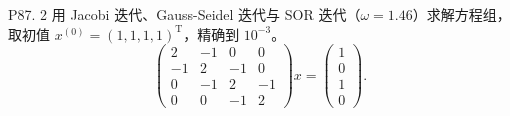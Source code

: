 \documentclass[11pt, a4paper]{ctexart}
\begin{document}
\begin{problem}{P87. 2 用 Jacobi 迭代、Gauss-Seidel 迭代与 SOR 迭代（$\omega = 1.46$）求解方程组，取初值 $x^{(0)} = (1, 1, 1, 1)^{\mathrm{T}}$，精确到 $10^{-3}$。}
    \[
        \begin{pmatrix}
            2 & -1 & 0 & 0 \\
            -1 & 2 & -1 & 0 \\
            0 & -1 & 2 & -1 \\
            0 & 0 & -1 & 2
        \end{pmatrix}
        x
        =
        \begin{pmatrix}
            1 \\
            0 \\
            1 \\
            0
        \end{pmatrix}.
    \]
\end{problem}
\end{document}

